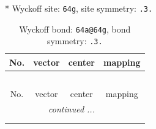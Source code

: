 \documentclass[fleqn,8pt]{jsarticle}
\begin{document}
* Wyckoff site: {\tt 64g}, site symmetry: {\tt .3.}
\renewcommand{\arraystretch}{1.2}
\begin{longtable}{cccc}
\caption{Wyckoff bond: {\tt 64a@64g}, bond symmetry: {\tt .3.}}
 \\
 \hline \hline
No. & vector & center & mapping \\ \hline \endfirsthead

\multicolumn{3}{l}{\tablename\ \thetable{}} \\
 \hline \hline
No. & vector & center & mapping \\ \hline \endhead

 \hline \hline
\multicolumn{3}{r}{\footnotesize\it continued ...} \\ \endfoot

 \hline \hline
\multicolumn{3}{r}{} \\ \endlastfoot


\end{longtable}
\end{document}
